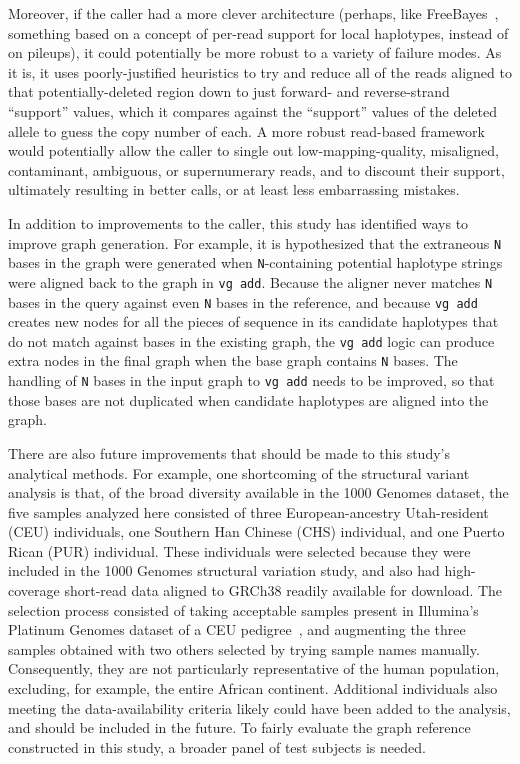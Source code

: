 Moreover, if the caller had a more clever architecture (perhaps, like FreeBayes~\cite{garrison2012haplotype}, something based on a concept of per-read support for local haplotypes, instead of on pileups), it could potentially be more robust to a variety of failure modes. As it is, it uses poorly-justified heuristics to try and reduce all of the reads aligned to that potentially-deleted region down to just forward- and reverse-strand ``support'' values, which it compares against the ``support'' values of the deleted allele to guess the copy number of each. A more robust read-based framework would potentially allow the caller to single out low-mapping-quality, misaligned, contaminant, ambiguous, or supernumerary reads, and to discount their support, ultimately resulting in better calls, or at least less embarrassing mistakes.

In addition to improvements to the caller, this study has identified ways to improve graph generation. For example, it is hypothesized that the extraneous \texttt{N} bases in the graph were generated when \texttt{N}-containing potential haplotype strings were aligned back to the graph in \texttt{vg add}. Because the \vg aligner never matches \texttt{N} bases in the query against even \texttt{N} bases in the reference, and because \texttt{vg add} creates new nodes for all the pieces of sequence in its candidate haplotypes that do not match against bases in the existing graph, the \texttt{vg add} logic can produce extra nodes in the final graph when the base graph contains \texttt{N} bases. The handling of \texttt{N} bases in the input graph to \texttt{vg add} needs to be improved, so that those bases are not duplicated when candidate haplotypes are aligned into the graph. 

There are also future improvements that should be made to this study's analytical methods. For example, one shortcoming of the structural variant analysis is that, of the broad diversity available in the 1000 Genomes dataset, the five samples analyzed here consisted of three European-ancestry Utah-resident (CEU) individuals, one Southern Han Chinese (CHS) individual, and one Puerto Rican (PUR) individual. These individuals were selected because they were included in the 1000 Genomes structural variation study, and also had high-coverage short-read data aligned to GRCh38 readily available for download. The selection process consisted of taking acceptable samples present in Illumina's Platinum Genomes dataset of a CEU pedigree~\cite{eberle2013platinum}, and augmenting the three samples obtained with two others selected by trying sample names manually. Consequently, they are not particularly representative of the human population, excluding, for example, the entire African continent. Additional individuals also meeting the data-availability criteria likely could have been added to the analysis, and should be included in the future. To fairly evaluate the graph reference constructed in this study, a broader panel of test subjects is needed.

